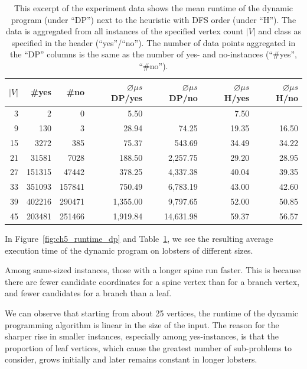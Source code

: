\begin{table}[t]
\centering
\begin{tabular}{ r|r|r|r|r|r|r }
\toprule
 $|V|$ & \#yes & \#no & $\varnothing \mu s$ DP/yes & $\varnothing \mu s$ DP/no & $\varnothing \mu s$ H/yes & $\varnothing \mu s$ H/no \\
 \hline
3	& 2 		& 0     	& 5.50	   &           &	7.50	&       \\
9	& 130		& 3     	& 28.94	   & 74.25	   &	19.35	& 16.50 \\
15	& 3272		& 385   	& 75.37	   & 543.69    &	34.49	& 34.22 \\
21	& 31581		& 7028  	& 188.50   & 2,257.75  &	29.20	& 28.95 \\
27	& 151315	& 47442		& 378.25   & 4,337.38  &	40.04	& 39.35 \\
33	& 351093	& 157841	& 750.49   & 6,783.19  &	43.00	& 42.60 \\
39	& 402216	& 290471	& 1,355.00 & 9,797.65  &	52.00	& 50.85 \\
45	& 203481	& 251466	& 1,919.84 & 14,631.98 &	59.37	& 56.57 \\
\bottomrule
\end{tabular}
\caption[Runtime of both algorithms by problem size]{This excerpt of the experiment data shows the mean runtime of the dynamic program (under ``DP'') next to the heuristic with DFS order (under ``H''). The data is aggregated from all instances of the specified vertex count $|V|$ and class as specified in the header (``yes''/``no''). The number of data points aggregated in the ``DP'' columns is the same as the number of yes- and no-instances (``\#yes'', ``\#no'').}
\label{tbl:runtime}
\end{table}

In Figure~\ref{fig:ch5_runtime_dp} and Table~\ref{tbl:runtime}, we see the resulting average execution time of the dynamic program on lobsters of different sizes.

Among same-sized instances, those with a longer spine run faster. This is because there are fewer candidate coordinates for a spine vertex than for a branch vertex, and fewer candidates for a branch than a leaf.

We can observe that starting from about 25 vertices, the runtime of the dynamic programming algorithm is linear in the size of the input. The reason for the sharper rise in smaller instances, especially among yes-instances, is that the proportion of leaf vertices, which cause the greatest number of sub-problems to consider, grows initially and later remains constant in longer lobsters.

